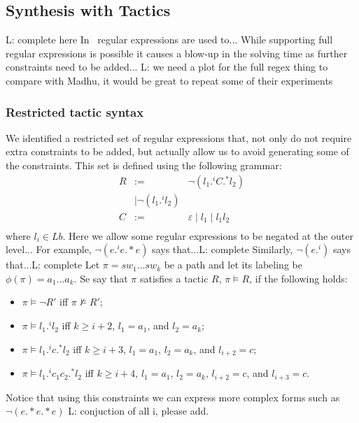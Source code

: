 \documentclass[]{sig}
\newcommand{\loris}[1]{\textcolor[rgb]{0.00,0.00,1.00}{L: #1}}
\begin{document}
\subsection{Synthesis with Tactics}
\loris{complete here}
In~\cite{} regular expressions are used to...
While supporting full regular expressions is possible it causes a blow-up in the solving time as further
constraints need to be added...
\loris{we need a plot for the full regex thing to compare with Madhu, it would be great to repeat some of their experiments}
 
\subsubsection{Restricted tactic syntax}
We identified a restricted set of regular expressions that, not only do not require extra constraints to be added,
but actually allow us to avoid generating some of the constraints.
This set is defined using the following grammar:
$$\begin{array}{rcl}
R  &  :=  &  \neg (l_1 .^i C .^* l_2) \\ 
	&  \mid \neg (l_1 .^i l_2)\\
C  &  :=  &  \varepsilon \mid l_1 \mid l_1 l_2\\
\end{array}$$
where $l_i\in Lb$.
Here we allow some regular expressions to be negated at the outer level...
For example, $\neg (e .^i e .* e)$ says that...\loris{complete}
Similarly, $\neg (e .^i)$ says that...\loris{complete}
Let $\pi = sw_1\ldots sw_k$ be a path and 
let its labeling be $\phi(\pi)= a_1\ldots a_k$.
Se say that $\pi$ satisfies a tactic $R$, $\pi\vDash R$, if the following
holds:
\begin{itemize}
\item $\pi \vDash \neg R'$ iff $\pi \not\vDash R'$;
\item $\pi \vDash  l_1 .^i l_2$ iff $k\geq i+2$, $l_1= a_1$, and $l_2= a_k$;
\item $\pi \vDash  l_1 .^i c.^* l_2$ iff $k\geq i+3$, $l_1= a_1$, $l_2= a_k$, and $l_{i+2}=c$;
\item $\pi \vDash  l_1 .^i c_1 c_2.^* l_2$ iff $k\geq i+4$, $l_1= a_1$, $l_2= a_k$, $l_{i+2}=c$, and $l_{i+3}=c$.
\end{itemize}

Notice that using this constraints we can express more complex forms such as
$\neg (e .* e .* e)$ \loris{conjuction of all i, please add}.
\end{document}

